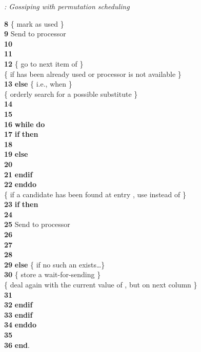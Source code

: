 \documentclass{elsart}
\newcommand{\keyw}[1]{\hbox{\bf #1}}
\begin{document}
\begin{alg}{\emph{: Gossiping with permutation scheduling}}
\begin{tabbing}
{\bf 8} \> \> \> \> \>  \>\>\>\>\>\>\>\> \{ mark  as used \} \\
{\bf 9} \> \> \> \> \> Send  to processor  \\
{\bf 10} \> \> \> \> \>  \\
{\bf 11} \> \> \> \> \>  \\
{\bf 12} \> \> \> \> \>  \>\>\>\>\>\>\>\> \{ go to next item of  \} \\
         \> \> \> \> \{ if  has been already used or processor  is not available \} \\
{\bf 13} \> \> \> \> \keyw{else} \>\>\>\>\>\>\>\>\> \{ i.e., when  \} \\
         \> \> \> \> \> \{ orderly search for a possible substitute \} \\
{\bf 14} \> \> \> \> \>  \\
{\bf 15} \> \> \> \> \>  \\
{\bf 16} \> \> \> \> \> \keyw{while}  \keyw{do} \\
{\bf 17} \> \> \> \> \> \> \keyw{if} 
			   \keyw{then}\\
{\bf 18} \> \> \> \> \> \> \> \\
{\bf 19} \> \> \> \> \> \> \keyw{else}\\
{\bf 20} \> \> \> \> \> \> \> \\
{\bf 21} \> \> \> \> \> \> \keyw{endif}\\
{\bf 22} \> \> \> \> \> \keyw{enddo}\\
         \> \> \> \> \> \{ if a candidate has been found at entry , use  instead of  \} \\
{\bf 23} \> \> \> \> \> \keyw{if}  \keyw{then} \\
{\bf 24} \> \> \> \> \> \>  \\
{\bf 25} \> \> \> \> \> \> Send  to processor  \\
{\bf 26} \> \> \> \> \> \>  \\
{\bf 27} \> \> \> \> \> \>  \\
{\bf 28} \> \> \> \> \> \>  \\
{\bf 29} \> \> \> \> \> \keyw{else} \>\>\>\>\>\>\>\> \{ if no such an  exists\ldots \} \\

{\bf 30} \> \> \> \> \> \>  \>\>\>\>\>\>\> \{ store a wait-for-sending \} \\
         \> \> \> \> \> \> \{ deal again with the current value of , but on next column \}\\
{\bf 31} \> \> \> \> \> \>  \\
{\bf 32} \> \> \> \> \> \keyw{endif}\\
{\bf 33} \> \> \> \> \keyw{endif}\\
{\bf 34} \> \> \> \keyw{enddo}\\
{\bf 35} \> \> \> \\
{\bf 36} \> \> \keyw{end}.
\end{tabbing}
\label{algo}
\end{alg}
\end{document}
